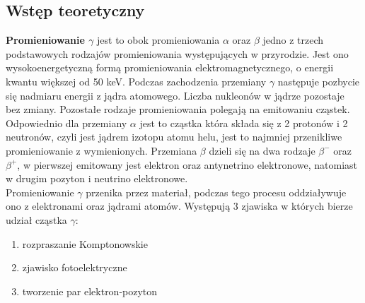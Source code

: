 \documentclass[a4paper]{article}
\begin{document}
\subsection{Wstęp teoretyczny}
\textbf{Promieniowanie $\gamma$} jest to obok promieniowania $\alpha$ oraz $\beta$ jedno z trzech podstawowych rodzajów promieniowania występujących w przyrodzie. Jest ono wysokoenergetyczną formą promieniowania elektromagnetycznego, o energii kwantu większej od 50 keV. Podczas zachodzenia przemiany $\gamma$ następuje pozbycie się nadmiaru energii z jądra atomowego. Liczba nukleonów w jądrze pozostaje bez zmiany. Pozostałe rodzaje promieniowania polegają na emitowaniu cząstek. Odpowiednio dla przemiany $\alpha$ jest to cząstka która składa się z 2 protonów i 2 neutronów, czyli jest jądrem izotopu atomu helu, jest to najmniej przenikliwe promieniowanie z wymienionych. Przemiana $\beta$ dzieli się na dwa rodzaje $\beta^{-}$ oraz $\beta^{+}$, w pierwszej emitowany jest elektron oraz antynetrino elektronowe, natomiast w drugim pozyton i neutrino elektronowe. \\
Promieniowanie $\gamma$ przenika przez materiał, podczas tego procesu oddziaływuje ono z elektronami oraz jądrami atomów. Występują 3 zjawiska w których bierze udział cząstka $\gamma$:
\begin{enumerate}
	\item{rozpraszanie Komptonowskie}
	\item{zjawisko fotoelektryczne}
	\item{tworzenie par elektron-pozyton}
\end{enumerate}
 
\end{document}
